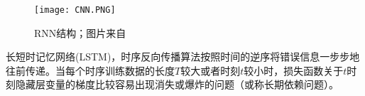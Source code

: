 \begin{figure}[htbp]
\begin{center}
\texttt{[image: CNN.PNG]}
\caption{RNN结构；图片来自\cite{zaccone2018deep}}
\label{fig3-RNN}
\end{center}
\end{figure}

长短时记忆网络(LSTM)，时序反向传播算法按照时间的逆序将错误信息一步步地往前传递。当每个时序训练数据的长度$T$较大或者时刻$t$较小时，损失函数关于$t$时刻隐藏层变量的梯度比较容易出现消失或爆炸的问题（或称长期依赖问题）。


\begin{comment}
\subsection{探测结果分析}

在信号探测中，检测概率和错误概率是最常需要的计算。目前在我们理论计算过程中，通常假设噪声都是高斯噪声，实际探测过程会是非高斯、非稳态的噪声，但这种需要在实际仪器运行过程中才能评估噪声特性。所以我们还是基于高斯稳态噪声的假设下进行的探测检验。

高斯噪声n(t)顾名思义其数据点特性满足高斯分布，则n分布密度函数为：

$p(n)=\frac{1}{\sqrt{2\pi}\sigma}e^{-(n-\mu_n)^2/2\sigma_n^2}$

公式中$\mu_n$和$\sigma_n^2$分别是噪声的均值和方差。从高斯函数特性也可得到n的累积分布函数(cumulative distribution function, CDF)为：

$F(n)=\int_n^{\infty}p(n)dn = \frac{1}{\sqrt{2\pi}}\sum_n^{\infty}e^{-(n-\mu_n)^2/2\sigma^2_n}
=\frac{1}{2}\frac{2}{\sqrt{\pi}}\sum^{\infty}_{(n-\mu_n)/\sqrt{2}\sigma}{e^{-t^2}dt}$

定义误差函数(error function)
$$
和误差补余函数
$$

则可以把累积分布函数和误差函数以及误差补余函数函数都串联起来。
即高斯噪声n的累积分布函数可以写成：
$F(n)=\frac{1}{2}erfc(\frac{(n-\mu_n)}{\sqrt{2}\sigma_n})=\frac{1}{2}[1-erf(\frac{(n-\mu_n)}{\sqrt{2}\sigma_n})]$

\end{comment}
